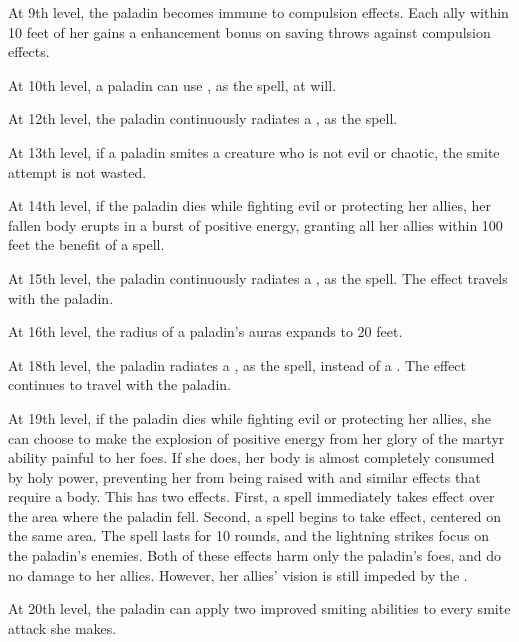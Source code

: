  At 9th level, the paladin becomes immune to compulsion effects. Each ally within 10 feet of her gains a  enhancement bonus on saving throws against compulsion effects.

\label{Pal:Detect Chaos} At 10th level, a paladin can use , as the spell, at will.

 At 12th level, the paladin continuously radiates a , as the spell.

 At 13th level, if a paladin smites a creature who is not evil or chaotic, the smite attempt is not wasted.

 At 14th level, if the paladin dies while fighting evil or protecting her allies, her fallen body erupts in a burst of positive energy, granting all her allies within 100 feet the benefit of a  spell.

 At 15th level, the paladin continuously radiates a , as the spell. The effect travels with the paladin.

 At 16th level, the radius of a paladin's auras expands to 20 feet.

 At 18th level, the paladin radiates a , as the spell, instead of a . The effect continues to travel with the paladin.

 At 19th level, if the paladin dies while fighting evil or protecting her allies, she can choose to make the explosion of positive energy from her glory of the martyr ability painful to her foes. If she does, her body is almost completely consumed by holy power, preventing her from being raised with  and similar effects that require a body. This has two effects. First, a  spell immediately takes effect over the area where the paladin fell. Second, a  spell begins to take effect, centered on the same area. The spell lasts for 10 rounds, and the lightning strikes focus on the paladin's enemies. Both of these effects harm only the paladin's foes, and do no damage to her allies. However, her allies' vision is still impeded by the .

 At 20th level, the paladin can apply two improved smiting abilities to every smite attack she makes.

